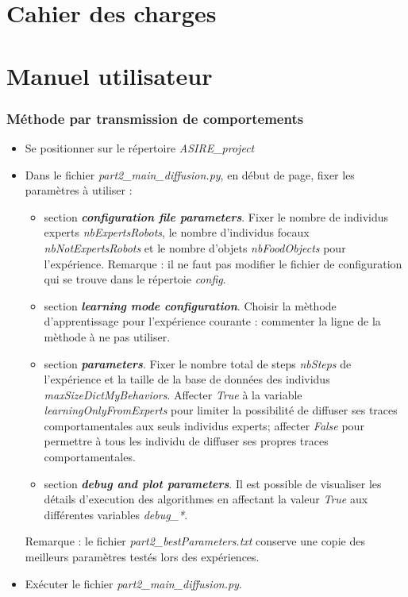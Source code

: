 \documentclass[a4paper, 12pt]{report}
\begin{document}
    \chapter{Cahier des charges}

    \chapter{Manuel utilisateur}
     
     
    \subsection{Méthode par transmission de comportements}
    
    \begin{itemize}
        \item Se positionner sur le répertoire \textit{ASIRE\_project}
        
        \item Dans le fichier \textit{part2\_main\_diffusion.py}, en début de page, fixer les paramètres à utiliser :
        
        \begin{itemize}
        \item section \textbf{\textit{configuration file parameters}}. Fixer le nombre de individus experts \textit{nbExpertsRobots}, le nombre d'individus focaux \textit{nbNotExpertsRobots} et le nombre d'objets \textit{nbFoodObjects} pour l'expérience. Remarque : il ne faut pas modifier le fichier de configuration qui se trouve dans le répertoie \textit{config}.
        \item section \textbf{\textit{learning mode configuration}}. Choisir la mèthode d'apprentissage pour l'expérience courante : commenter la ligne de la mèthode à ne pas utiliser.
      \item section \textbf{\textit{parameters}}. Fixer le nombre total de steps \textit{nbSteps} de l'expérience et la taille de la base de données des individus \textit{maxSizeDictMyBehaviors}. Affecter \textit{True} à la variable \textit{learningOnlyFromExperts} pour limiter la possibilité de diffuser ses traces comportamentales aux seuls individus experts; affecter \textit{False} pour permettre à tous les individu de diffuser ses propres traces comportamentales.
            \item section \textbf{\textit{debug and plot parameters}}. Il est possible de visualiser les détails d'execution des algorithmes en affectant la valeur \textit{True} aux différentes variables \textit{debug\_*}.
            
        \end{itemize}
        
        Remarque : le fichier \textit{part2\_bestParameters.txt} conserve une copie des meilleurs paramètres testés lors des expériences.
        
        \item Exécuter le fichier \textit{part2\_main\_diffusion.py}.
    
    \end{itemize}
\end{document}

